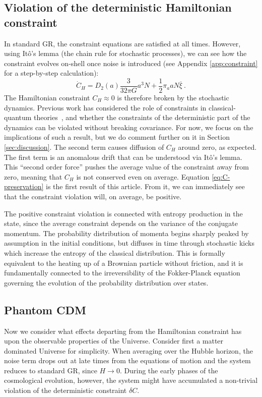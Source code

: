 \documentclass[amsmath,amssymb,11pt]{article}
\begin{document}
\subsection{Violation of the deterministic Hamiltonian constraint}
\label{sec:violation_CH}
In standard GR, the constraint equations are satisfied at all times. However, using It\^{o}'s lemma (the chain rule for stochastic processes), we can see how the constraint evolves on-shell once noise is introduced (see Appendix \ref{app:constraint} for a step-by-step calculation):
\begin{equation}
    \dot{C}_H= D_2(a) \frac{3}{32\pi G}  a^3 N + \frac{1}{2} \pi_a a N\bar{\xi} \ .
    \label{eq:C-preservation}
\end{equation}
The Hamiltonian constraint $C_H\approx0$ is therefore broken by the stochastic dynamics. Previous work has considered the role of constraints in classical-quantum theories~\cite{oppenheim2021constraints,oppenheim2022constraints}, and whether the constraints of the deterministic part of the dynamics can be violated without breaking covariance. For now, we focus on the implications of such a result, but we do comment further on it in Section \ref{sec:discussion}. The second term causes diffusion of $C_H$ around zero, as expected. The first term is an anomalous drift that can be understood via It\^{o}'s lemma. This “second order force” pushes the average value of the constraint away from zero, meaning that $C_H$ is not conserved even on average. Equation \eqref{eq:C-preservation} is the first result of this article. From it, we can immediately see that the constraint violation will, on average, be positive.

The positive constraint violation is connected with entropy production in the state, since the average constraint depends on the variance of the conjugate momentum. The probability distribution of momenta begins sharply peaked by assumption in the initial conditions, but diffuses in time through stochastic kicks which increase the entropy of the classical distribution. This is formally equivalent to the heating up of a Brownian particle without friction, and it is fundamentally connected to the irreversibility of the Fokker-Planck equation governing the evolution of the probability distribution over states. 

\subsection{Phantom CDM}
Now we consider what effects departing from the Hamiltonian constraint has upon the observable properties of the Universe. Consider first a matter dominated Universe for simplicity. When averaging over the Hubble horizon, the noise term drops out at late times from the equations of motion and the system reduces to standard GR, since $H \to 0$. During the early phases of the cosmological evolution, however, the system might have accumulated a non-trivial violation of the deterministic constraint $\delta C$. 
\end{document}
